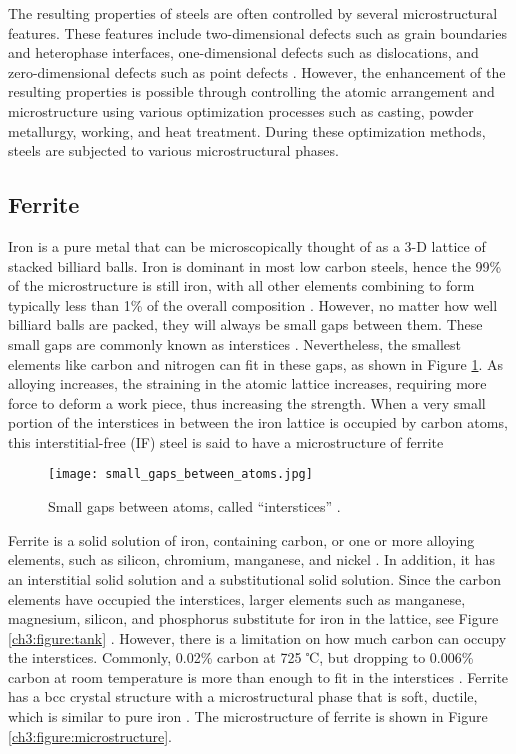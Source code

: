 The resulting properties of steels are often controlled by several microstructural features. These features include two-dimensional defects such as grain boundaries and heterophase interfaces, one-dimensional defects such as dislocations, and zero-dimensional defects such as point defects \cite{clemens2017microstructure}. However, the enhancement of the resulting properties is possible through controlling the atomic arrangement and microstructure using various optimization processes such as casting, powder metallurgy, working, and heat treatment. During these optimization methods, steels are subjected to various microstructural phases.

\subsection{Ferrite} 
Iron is a pure metal that can be microscopically thought of as a 3-D lattice of stacked billiard balls. Iron is dominant in most low carbon steels, hence the 99\% of the microstructure is still iron, with all other elements combining to form typically less than 1\% of the overall composition \cite{bajaj2020steels}. However, no matter how well billiard balls are packed, they will always be small gaps between them. These small gaps are commonly known as interstices \cite{bajaj2020steels}. Nevertheless, the smallest elements like carbon and nitrogen can fit in these gaps, as shown in Figure \ref{ch3:figure:gaps}. As alloying increases, the straining in the atomic lattice increases, requiring more force to deform a work piece, thus increasing the strength. When a very small portion of the interstices in between the iron lattice is occupied by carbon atoms, this interstitial-free (IF) steel is said to have a microstructure of ferrite \cite{bhadeshia2017steels}
 
\begin{figure}[H]
    \centering
    \texttt{[image: small\_gaps\_between\_atoms.jpg]}
    \caption{Small gaps between atoms, called “interstices” \cite{bajaj2020steels}.}
    \label{ch3:figure:gaps}
\end{figure}

Ferrite is a solid solution of iron, containing carbon, or one or more alloying elements, such as silicon, chromium, manganese, and nickel \cite{molabe2018determining}. In addition, it has an interstitial solid solution and a substitutional solid solution. Since the carbon elements have occupied the interstices, larger elements such as manganese, magnesium, silicon, and phosphorus substitute for iron in the lattice, see Figure \ref{ch3:figure:tank} \cite{jones2012engineering}. However, there is a limitation on how much carbon can occupy the interstices. Commonly, 0.02\% carbon at 725 ℃, but dropping to 0.006\% carbon at room temperature is more than enough to fit in the interstices \cite{bhadeshia2017steels}. Ferrite has a bcc crystal structure with a microstructural phase that is soft, ductile, which is similar to pure iron \cite{bajaj2020steels}. The microstructure of ferrite is shown in Figure \ref{ch3:figure:microstructure}.

